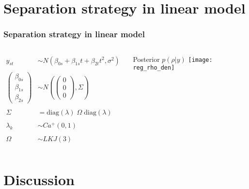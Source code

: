\documentclass[9pt]{beamer}\usepackage[]{graphicx}\usepackage[]{color}
\begin{document}
\section{Separation strategy in linear model}
\begin{frame}
\frametitle{Separation strategy in linear model}
  \begin{columns}[T] %


\[\begin{array}{cl}
y_{st}  & \sim  N(\beta_{0s} + \beta_{1s} t + \beta_{2t}t^2, \sigma^2) \\
& \\
\begin{pmatrix} \beta_{0s} \\ \beta_{1s} \\ \beta_{2s} \end{pmatrix} & \sim  N \left( \begin{pmatrix} 0 \\ 0 \\ 0 \end{pmatrix} , \Sigma \right) \\
& \\
\Sigma & = \mbox{diag}(\lambda)\; \Omega\; \mbox{diag}(\lambda) \\
& \\
\lambda_k & \sim Ca^+(0, 1) \\ 
& \\
\Omega & \sim LKJ(3) 
\end{array}
\]

  \pause
  Posterior $p(\rho| y)$ 
    \texttt{[image: reg\_rho\_den]}
  \end{columns}
\end{frame}



\section{Discussion}
\end{document}

